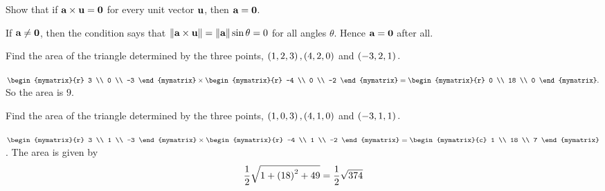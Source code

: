 \begin{enumialphparenastyle}

\begin{ex} Show that if $\mbox{\bf a}\times \mbox{\bf u}=\mbox{\bf 0}$ for every unit vector $\mbox{\bf u}
$, then $\mbox{\bf a}=\mbox{\bf 0}$.
\begin{sol}
If $\mbox{\bf a}\neq \mbox{\bf 0}$, then the condition says that $\left\|\mbox{\bf a}\times \mbox{\bf u}\right\| = \left\|\mbox{\bf a}\right\| \sin \theta =0$ for all angles $\theta $. Hence $\mbox{\bf a} = \mbox{\bf 0}$ after all.
\end{sol}
\end{ex}

\begin{ex} Find the area of the triangle determined by the three points, $\left(
1,2,3\right) ,\left(4,2,0\right) $ and $\left(-3,2,1\right) .$
\begin{sol}
$\begin{mymatrix}{r}
3 \\
0 \\
-3
\end{mymatrix} \times \begin{mymatrix}{r}
 -4 \\
0 \\
-2
\end{mymatrix} =\begin{mymatrix}{r}
0 \\
18 \\
0
\end{mymatrix} .$ So the area is $9.$
\end{sol}
\end{ex}

\begin{ex} Find the area of the triangle determined by the three points, $\left(
1,0,3\right) ,\left(4,1,0\right) $ and $\left(-3,1,1\right) .$
\begin{sol}
 $\begin{mymatrix}{r}
3 \\
1 \\
-3
\end{mymatrix} \times \begin{mymatrix}{r}
 -4 \\
1 \\
-2
\end{mymatrix} =\begin{mymatrix}{c}
1 \\
18 \\
7
\end{mymatrix}$. The area is given by 
\[
\frac{1}{2}\sqrt{1+\left(18\right) ^{2}+49}=\frac{1}{2}\sqrt{374}
\]
\end{sol}
\end{ex}


\end{enumialphparenastyle}
